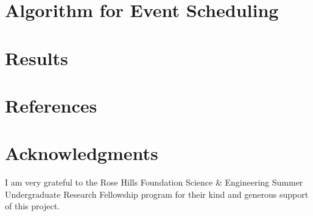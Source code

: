 \documentclass[thesis]{hmcposter}
\begin{document}
\begin{poster}
\section{Algorithm for Event Scheduling}

\section{Results}%

\section{References}

%
\vfill

\section{Acknowledgments}
I am very grateful to the Rose	Hills	Foundation Science \& Engineering Summer Undergraduate Research Fellowship program for their kind and generous support of this project.


\vfill
\end{poster}
\end{document}
